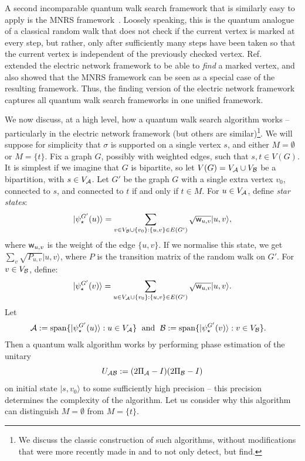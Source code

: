 \documentclass{theoretics}
\def\ket#1{{\lvert}#1\rangle}
\renewcommand{\>}{\rangle}
\newcommand{\<}{\langle}
\renewcommand{\(}{\left(}
\renewcommand{\)}{\right)}
\def\w{{\sf w}}
\begin{document}
A second incomparable quantum walk search framework that is similarly easy to apply is the MNRS framework~\cite{magniez2006SearchQuantumWalk}. Loosely speaking, this is the quantum analogue of a classical random walk that does not check if the current vertex is marked at every step, but rather, only after sufficiently many steps have been taken so that the current vertex is independent of the previously checked vertex. Ref.~\cite{apers2019UnifiedFrameworkQWSearch} extended the electric network framework to be able to \emph{find} a marked vertex, and also showed that the MNRS framework can be seen as a special case of the resulting framework. Thus, the finding version of the electric network framework captures all quantum walk search frameworks in one unified framework. 

We now discuss, at a high level, how a quantum walk search algorithm works -- particularly in the electric network framework (but others are similar)\footnote{We discuss the classic construction of such algorithms, without modifications that were more recently made in \cite{ambainis2019QuadSpeedupFindingMarkedQW} and \cite{apers2019UnifiedFrameworkQWSearch} to not only detect, but find.}. We will suppose for simplicity that $\sigma$ is supported on a single vertex $s$, and either $M=\emptyset$ or $M=\{t\}$. 
Fix a graph $G$, possibly with weighted edges, such that $s,t\in V(G)$. It is simplest if we imagine that $G$ is bipartite, so let $V(G)=V_{\cal A}\cup V_{\cal B}$ be a bipartition, with $s\in V_{\cal A}$. Let $G'$ be the graph $G$ with a single extra vertex $v_0$, connected to $s$, and connected to $t$ if and only if $t\in M$. 
For $u\in V_{\cal A}$, define \emph{star states}:
$$\ket{\psi_\star^{G'}(u)} = \sum_{v\in V_{\cal B}\cup\{v_0\}:\{u,v\}\in E(G')}\sqrt{\w_{u,v}}\ket{u,v},$$
where $\w_{u,v}$ is the weight of the edge $\{u,v\}$. If we normalise this state, we get $\sum_v\sqrt{P_{u,v}}\ket{u,v}$, where $P$ is the transition matrix of the random walk on $G'$. For $v\in V_{\cal B}$, define:
$$\ket{\psi_\star^{G'}(v)} = \sum_{u\in V_{\cal A}\cup\{v_0\}:\{u,v\}\in E(G')}\sqrt{\w_{u,v}}\ket{u,v}.$$
Let
\begin{align*}
{\cal A} &:= \mathrm{span}\{\ket{\psi_\star^{G'}(u)}: u\in V_{\cal A}\}
\;\mbox{ and }\;{\cal B} := \mathrm{span}\{\ket{\psi_\star^{G'}(v)}: v\in V_{\cal B}\}.
\end{align*}
Then a quantum walk algorithm works by performing phase estimation of the unitary 
$$U_{\cal AB}:=(2\Pi_{\cal A}-I)(2\Pi_{\cal B}-I)$$
on initial state $\ket{s,v_0}$ to some sufficiently high precision -- this precision determines the complexity of the algorithm. Let us consider why this algorithm can distinguish $M=\emptyset$ from $M=\{t\}$. 
\end{document}
